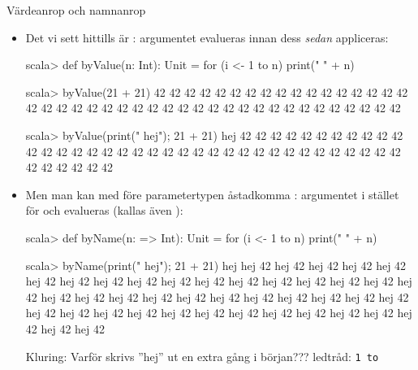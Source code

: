 \begin{Slide}{Värdeanrop och namnanrop}\SlideFontSmall
\begin{itemize}
\item Det vi sett hittills är : argumentet evalueras  innan dess  \emph{sedan} appliceras:
\begin{REPL}
scala> def byValue(n: Int): Unit = for (i <- 1 to n) print(" " + n)

scala> byValue(21 + 21)
 42 42 42 42 42 42 42 42 42 42 42 42 42 42 42 42 42 42 42 42 42 42 42 42 42 42 42 42 42 42 42 42 42 42 42 42 42 42 42 42 42 42

scala> byValue({print(" hej"); 21 + 21})
 hej 42 42 42 42 42 42 42 42 42 42 42 42 42 42 42 42 42 42 42 42 42 42 42 42 42 42 42 42 42 42 42 42 42 42 42 42 42 42 42 42 42 42
\end{REPL}

\pause

\item Men man kan med \code{=>} före parametertypen åstadkomma : argumentet  i stället för  och evalueras  (kallas även ):
\begin{REPL}
scala> def byName(n: => Int): Unit = for (i <- 1 to n) print(" " + n)

scala> byName({print(" hej"); 21 + 21})
 hej hej 42 hej 42 hej 42 hej 42 hej 42 hej 42 hej 42 hej 42 hej 42 hej 42 hej 42 hej 42 hej 42 hej 42 hej 42 hej 42 hej 42 hej 42 hej 42 hej 42 hej 42 hej 42 hej 42 hej 42 hej 42 hej 42 hej 42 hej 42 hej 42 hej 42 hej 42 hej 42 hej 42 hej 42 hej 42 hej 42 hej 42 hej 42 hej 42 hej 42 hej 42 hej 42
\end{REPL}

Kluring: Varför skrivs ''hej'' ut en extra gång i början??? \pause ledtråd: \texttt{1 to }
\end{itemize}
\end{Slide}

